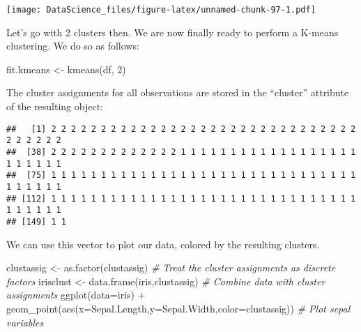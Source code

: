 \documentclass[
]{book}
\newenvironment{Shaded}{\begin{snugshade}}{\end{snugshade}}
\newcommand{\AttributeTok}[1]{\textcolor[rgb]{0.77,0.63,0.00}{#1}}
\newcommand{\CommentTok}[1]{\textcolor[rgb]{0.56,0.35,0.01}{\textit{#1}}}
\newcommand{\DecValTok}[1]{\textcolor[rgb]{0.00,0.00,0.81}{#1}}
\newcommand{\FunctionTok}[1]{\textcolor[rgb]{0.00,0.00,0.00}{#1}}
\newcommand{\NormalTok}[1]{#1}
\newcommand{\OtherTok}[1]{\textcolor[rgb]{0.56,0.35,0.01}{#1}}
\newcommand{\SpecialCharTok}[1]{\textcolor[rgb]{0.00,0.00,0.00}{#1}}
\begin{document}
\texttt{[image: DataScience\_files/figure-latex/unnamed-chunk-97-1.pdf]}

Let's go with 2 clusters then. We are now finally ready to perform a K-means clustering. We do so as follows:

\begin{Shaded}
\begin{Highlighting}[]
\NormalTok{fit.kmeans }\OtherTok{\textless{}{-}} \FunctionTok{kmeans}\NormalTok{(df, }\DecValTok{2}\NormalTok{)}
\end{Highlighting}
\end{Shaded}

The cluster assignments for all observations are stored in the ``cluster'' attribute of the resulting object:

\begin{Shaded}
\end{Shaded}

\begin{verbatim}
##   [1] 2 2 2 2 2 2 2 2 2 2 2 2 2 2 2 2 2 2 2 2 2 2 2 2 2 2 2 2 2 2 2 2 2 2 2 2 2
##  [38] 2 2 2 2 2 2 2 2 2 2 2 2 2 1 1 1 1 1 1 1 1 1 1 1 1 1 1 1 1 1 1 1 1 1 1 1 1
##  [75] 1 1 1 1 1 1 1 1 1 1 1 1 1 1 1 1 1 1 1 1 1 1 1 1 1 1 1 1 1 1 1 1 1 1 1 1 1
## [112] 1 1 1 1 1 1 1 1 1 1 1 1 1 1 1 1 1 1 1 1 1 1 1 1 1 1 1 1 1 1 1 1 1 1 1 1 1
## [149] 1 1
\end{verbatim}

We can use this vector to plot our data, colored by the resulting clusters.

\begin{Shaded}
\begin{Highlighting}[]
\NormalTok{clustassig }\OtherTok{\textless{}{-}} \FunctionTok{as.factor}\NormalTok{(clustassig) }\CommentTok{\# Treat the cluster assignments as discrete factors}
\NormalTok{irisclust }\OtherTok{\textless{}{-}} \FunctionTok{data.frame}\NormalTok{(iris,clustassig) }\CommentTok{\# Combine data with cluster assignments}
\FunctionTok{ggplot}\NormalTok{(}\AttributeTok{data=}\NormalTok{iris) }\SpecialCharTok{+} \FunctionTok{geom\_point}\NormalTok{(}\FunctionTok{aes}\NormalTok{(}\AttributeTok{x=}\NormalTok{Sepal.Length,}\AttributeTok{y=}\NormalTok{Sepal.Width,}\AttributeTok{color=}\NormalTok{clustassig)) }\CommentTok{\# Plot sepal variables}
\end{Highlighting}
\end{Shaded}
\end{document}
